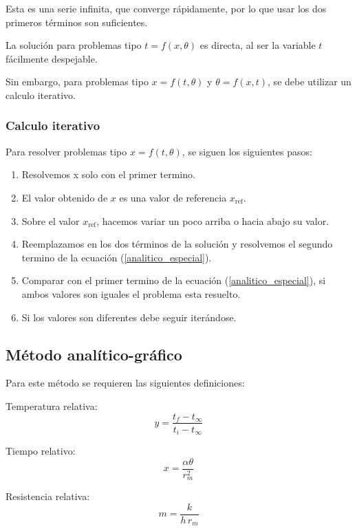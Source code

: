 Esta es una serie infinita, que converge rápidamente, por lo que usar los dos
primeros términos son suficientes.

La solución para problemas tipo $t = f(x,\theta)$ es directa, al ser la variable
$t$ fácilmente despejable.

Sin embargo, para problemas tipo $x = f(t,\theta)$ y $\theta = f(x,t)$, se debe
utilizar un calculo iterativo.

\subsubsection{Calculo iterativo}
Para resolver problemas tipo $x = f(t,\theta)$, se siguen los siguientes pasos:

\begin{enumerate}
    \item Resolvemos x solo con el primer termino.
    \item El valor obtenido de $x$ es una valor de referencia $x_{\text{ref}}$.
    \item Sobre el valor $x_{\text{ref}}$, hacemos variar un poco arriba o hacia
        abajo su valor.
    \item Reemplazamos en los dos términos de la solución y resolvemos el
        segundo termino de la ecuación (\ref{analitico_especial}).
    \item Comparar con el primer termino de la ecuación
        (\ref{analitico_especial}), si ambos valores son iguales el problema
        esta resuelto.
    \item Si los valores son diferentes debe seguir iterándose.
\end{enumerate}

\subsection{Método analítico-gráfico}
Para este método se requieren las siguientes definiciones:

Temperatura relativa:
\begin{equation*}
    y = \frac{t_f-t_\infty}{t_i-t_\infty}
\end{equation*}

Tiempo relativo:
\begin{equation*}
    x = \frac{\alpha\theta}{r_m^2}
\end{equation*}

Resistencia relativa:
\begin{equation*}
    m = \frac{k}{h\,r_m}
\end{equation*}

